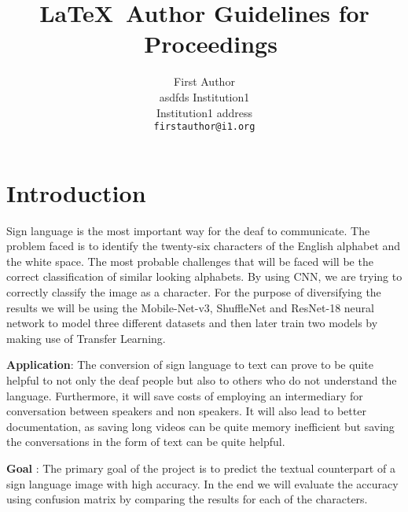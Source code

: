 \documentclass[10pt,twocolumn,letterpaper]{article}
\begin{document}
  \title{\LaTeX\ Author Guidelines for \confName~Proceedings}

  \author{First Author\\ asdfds
  Institution1\\
  Institution1 address\\
  {\tt\small firstauthor@i1.org}
  }
  \maketitle


  \section{Introduction}
  \label{sec:intro}

Sign language is the most important way for the deaf to communicate. The problem faced is to identify the twenty-six characters of the English alphabet and the white space. The most probable challenges that will be faced will be the correct classification of similar looking alphabets. By using CNN, we are trying to correctly classify the image as a character. For the purpose of diversifying the results we will be using the Mobile-Net-v3, ShuffleNet and ResNet-18 neural network to model three different datasets and then later train two models by making use of Transfer Learning.
\par
{\bfseries Application}: The conversion of sign language to text can prove to be quite helpful to not only the deaf people but also to others who do not understand the language. Furthermore, it will save costs of employing an intermediary for conversation between speakers and non speakers. It will also lead to better documentation, as saving long videos can be quite memory inefficient but saving the conversations in the form of text can be quite helpful.
\par
{\bfseries Goal} : The primary goal of the project is to predict the textual counterpart of a sign language image with high accuracy. In the end we will evaluate the accuracy using confusion matrix by comparing the results for each of the characters.
\end{document}
